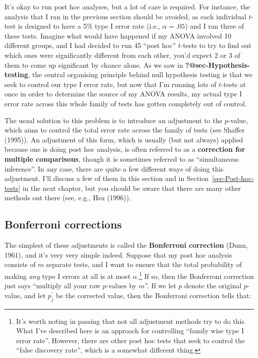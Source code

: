 \documentclass[
  a4paper,
]{book}
\begin{document}
It's okay to run post hoc analyses, but a lot of care is required. For
instance, the analysis that I ran in the previous section should be
avoided, as each individual \(t\)-test is designed to have a 5\% type I
error rate (i.e., \(\alpha = .05\)) and I ran three of these tests.
Imagine what would have happened if my ANOVA involved 10 different
groups, and I had decided to run 45 ``post hoc'' \(t\)-tests to try to
find out which ones were significantly different from each other, you'd
expect 2 or 3 of them to come up significant by chance alone. As we saw
in \textbf{?@sec-Hypothesis-testing}, the central organising principle
behind null hypothesis testing is that we seek to control our type I
error rate, but now that I'm running lots of \(t\)-tests at once in
order to determine the source of my ANOVA results, my actual type I
error rate across this whole family of tests has gotten completely out
of control.

The usual solution to this problem is to introduce an adjustment to the
\(p\)-value, which aims to control the total error rate across the
family of tests (see Shaffer (1995)). An adjustment of this form, which
is usually (but not always) applied because one is doing post hoc
analysis, is often referred to as a \textbf{correction for multiple
comparisons}, though it is sometimes referred to as ``simultaneous
inference''. In any case, there are quite a few different ways of doing
this adjustment. I'll discuss a few of them in this section and in
Section~\ref{sec-Post-hoc-tests} in the next chapter, but you should be
aware that there are many other methods out there (see, e.g., Hsu
(1996)).

\hypertarget{bonferroni-corrections}{%
\subsection{Bonferroni corrections}\label{bonferroni-corrections}}

The simplest of these adjustments is called the \textbf{Bonferroni
correction} (Dunn, 1961), and it's very very simple indeed. Suppose that
my post hoc analysis consists of \(m\) separate tests, and I want to
ensure that the total probability of making \emph{any} type I errors at
all is at most \(\alpha\).\footnote{It's worth noting in passing that
  not all adjustment methods try to do this. What I've described here is
  an approach for controlling ``family wise type I error rate''.
  However, there are other post hoc tests that seek to control the
  ``false discovery rate'', which is a somewhat different thing.} If so,
then the Bonferroni correction just says ``multiply all your raw
\(p\)-values by \(m\)''. If we let \(p\) denote the original
\(p\)-value, and let \(p_j^{'}\) be the corrected value, then the
Bonferroni correction tells that:
\end{document}
